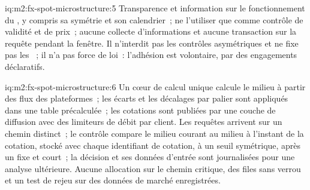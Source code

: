\begin{solution}{iq:m2:fx-spot-microstructure:5}
Transparence et information sur le fonctionnement du , y compris sa symétrie et son
calendrier~; ne l'utiliser que comme contrôle de validité et de prix~; aucune collecte d'informations
et aucune transaction sur la requête pendant la fenêtre. Il n'interdit pas les contrôles asymétriques
et ne fixe pas les ~; il n'a pas force de loi~: l'adhésion est volontaire,
par des engagements déclaratifs.
\end{solution}

\begin{solution}{iq:m2:fx-spot-microstructure:6}
Un cœur de calcul unique calcule le milieu à partir des flux des plateformes~; les écarts et les décalages
par palier sont appliqués dans une table précalculée~; les cotations sont publiées par une couche de diffusion
avec des limiteurs de débit par client. Les requêtes arrivent sur un chemin distinct~; le contrôle compare
le milieu courant au milieu à l'instant de la cotation, stocké avec chaque identifiant de cotation,
à un seuil symétrique, après un  fixe et court~; la décision et ses données d'entrée
sont journalisées pour une analyse ultérieure. Aucune allocation sur le chemin critique, des files sans verrou
et un test de rejeu sur des données de marché enregistrées.
\end{solution}
